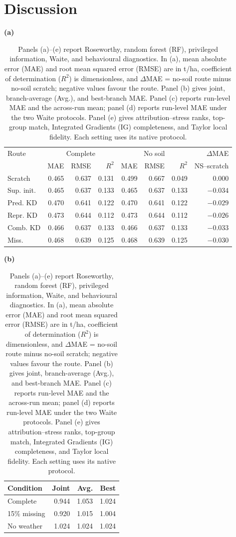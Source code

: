 \documentclass[runningheads]{venue/lncs/llncs}
\begin{document}
\FloatBarrier

\section{Discussion}

\begin{table}[t]
\centering
\small
\setlength{\tabcolsep}{3.0pt}
\renewcommand{\arraystretch}{0.94}
\caption{Panels (a)--(e) report Roseworthy, random forest (RF), privileged information, Waite, and behavioural diagnostics. In (a), mean absolute error (MAE) and root mean squared error (RMSE) are in t/ha, coefficient of determination ($R^2$) is dimensionless, and $\Delta$MAE = no-soil route minus no-soil scratch; negative values favour the route. Panel (b) gives joint, branch-average (Avg.), and best-branch MAE. Panel (c) reports run-level MAE and the across-run mean; panel (d) reports run-level MAE under the two Waite protocols. Panel (e) gives attribution--stress ranks, top-group match, Integrated Gradients (IG) completeness, and Taylor local fidelity. Each setting uses its native protocol.}
\label{tab:cross-scale}
\textbf{(a)}\\[-2pt]
\begin{tabular}{@{}lrrrrrrr@{}}
\toprule
Route & \multicolumn{3}{c}{Complete} & \multicolumn{3}{c}{No soil} & $\Delta$MAE\\
 & MAE & RMSE & $R^2$ & MAE & RMSE & $R^2$ & NS--scratch\\
\midrule
Scratch & 0.465 & 0.637 & 0.131 & 0.499 & 0.667 & 0.049 & 0.000\\
Sup. init. & 0.465 & 0.637 & 0.133 & 0.465 & 0.637 & 0.133 & $-0.034$\\
Pred. KD & 0.470 & 0.641 & 0.122 & 0.470 & 0.641 & 0.122 & $-0.029$\\
Repr. KD & 0.473 & 0.644 & 0.112 & 0.473 & 0.644 & 0.112 & $-0.026$\\
Comb. KD & 0.466 & 0.637 & 0.133 & 0.466 & 0.637 & 0.133 & $-0.033$\\
Miss. & 0.468 & 0.639 & 0.125 & 0.468 & 0.639 & 0.125 & $-0.030$\\
\bottomrule
\end{tabular}

\vspace{4pt}
\begin{minipage}[t]{.49\linewidth}
\centering
\scriptsize
\textbf{(b)}\\[-2pt]
\begin{tabular}{@{}lrrr@{}}
\toprule
Condition & Joint & Avg. & Best\\
\midrule
Complete & 0.944 & 1.053 & 1.024\\
15\% missing & 0.920 & 1.015 & 1.004\\
No weather & 1.024 & 1.024 & 1.024\\
\bottomrule
\end{tabular}


\end{minipage}
\end{table}
\end{document}
